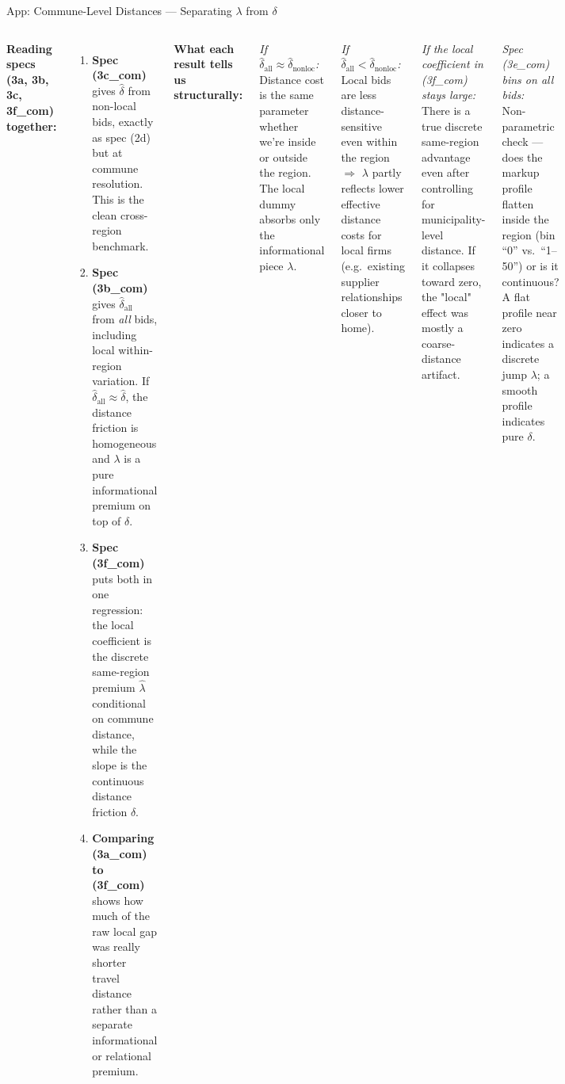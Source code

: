 \documentclass[9pt,aspectratio=169]{beamer}
\begin{document}
\begin{frame}{App: Commune-Level Distances --- Separating $\lambda$ from $\delta$}
\begin{columns}[T]
  \textbf{Reading specs (3a, 3b, 3c, 3f\_com) together:}
  \begin{enumerate}
    \item \textbf{Spec (3c\_com)} gives $\hat\delta$ from non-local bids,
          exactly as spec (2d) but at commune resolution.
          This is the clean cross-region benchmark.
    \item \textbf{Spec (3b\_com)} gives $\hat\delta_{\text{all}}$ from
          \emph{all} bids, including local within-region variation.
          If $\hat\delta_{\text{all}} \approx \hat\delta$, the
          distance friction is homogeneous and $\lambda$ is a
          pure informational premium on top of $\delta$.
    \item \textbf{Spec (3f\_com)} puts both in one regression:
          the local coefficient is the discrete same-region premium
          $\hat\lambda$ conditional on commune distance, while the
          slope is the continuous distance friction $\hat\delta$.
    \item \textbf{Comparing (3a\_com) to (3f\_com)} shows how much of the
          raw local gap was really shorter travel distance rather than a
          separate informational or relational premium.
  \end{enumerate}

  \textbf{What each result tells us structurally:}

  \smallskip
  \textit{If $\hat\delta_{\text{all}} \approx \hat\delta_{\text{nonloc}}$:}\\
  Distance cost is the same parameter whether we're inside or outside the
  region.  The local dummy absorbs only the informational piece $\lambda$.

  \smallskip
  \textit{If $\hat\delta_{\text{all}} < \hat\delta_{\text{nonloc}}$:}\\
  Local bids are less distance-sensitive even within the region $\Rightarrow$
  $\lambda$ partly reflects lower effective distance costs for local firms
  (e.g.\ existing supplier relationships closer to home).

  \smallskip
  \textit{If the local coefficient in (3f\_com) stays large:}\\
  There is a true discrete same-region advantage even after controlling for
  municipality-level distance.  If it collapses toward zero, the "local"
  effect was mostly a coarse-distance artifact.

  \smallskip
  \textit{Spec (3e\_com) bins on all bids:}\\
  Non-parametric check --- does the markup profile flatten inside the region
  (bin ``0'' vs.\ ``1--50'') or is it continuous?  A flat profile near zero
  indicates a discrete jump $\lambda$; a smooth profile indicates pure $\delta$.
\end{columns}
\end{frame}
\end{document}
